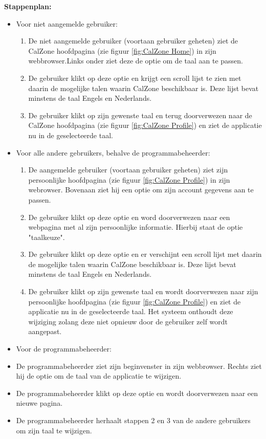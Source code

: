 \textbf{Stappenplan:}
\begin{itemize}

\item Voor niet aangemelde gebruiker:
	\begin{enumerate}
	\item De niet aangemelde gebruiker (voortaan gebruiker geheten) ziet de CalZone hoofdpagina (zie figuur \ref{fig:CalZone Home}) in zijn webbrowser.Links onder ziet deze de optie om de taal aan te passen.
	\item De gebruiker klikt op deze optie en krijgt een scroll lijst te zien met daarin de mogelijke talen waarin CalZone beschikbaar is. Deze lijst bevat minstens de taal Engels en Nederlands.
	\item De gebruiker klikt op zijn gewenste taal en terug doorverwezen naar de CalZone hoofdpagina (zie figuur \ref{fig:CalZone Profile}) en ziet de applicatie nu in de geselecteerde taal. 
	\end{enumerate}

\item Voor alle andere gebruikers, behalve de programmabeheerder:
	\begin{enumerate}
	\item De aangemelde gebruiker (voortaan gebruiker geheten) ziet zijn persoonlijke hoofdpagina (zie figuur \ref{fig:CalZone Profile}) in zijn webrowser. Bovenaan ziet hij een optie om zijn account gegevens aan te passen.
	\item De gebruiker klikt op deze optie en word doorverwezen naar een webpagina met al zijn persoonlijke informatie. Hierbij staat de optie "taalkeuze". 
	\item De gebruiker klikt op deze optie en er verschijnt een scroll lijst met daarin de mogelijke talen waarin CalZone beschikbaar is. Deze lijst bevat minstens de taal Engels en Nederlands.
	\item De gebruiker klikt op zijn gewenste taal en wordt doorverwezen naar zijn persoonlijke hoofdpagina (zie figuur \ref{fig:CalZone Profile}) en ziet de applicatie nu in de geselecteerde taal. Het systeem onthoudt deze wijziging zolang deze niet opnieuw door de gebruiker zelf wordt aangepast.
	\end{enumerate}
	
\item Voor de programmabeheerder:
	\item De programmabeheerder ziet zijn beginvenster in zijn webbrowser. Rechts ziet hij de optie om de taal van de applicatie te wijzigen.
	\item De programmabeheerder klikt op deze optie en wordt doorverwezen naar een nieuwe pagina. 
	\item De programmabeheerder herhaalt stappen 2 en 3 van de andere gebruikers om zijn taal te wijzigen.
\end{itemize}

